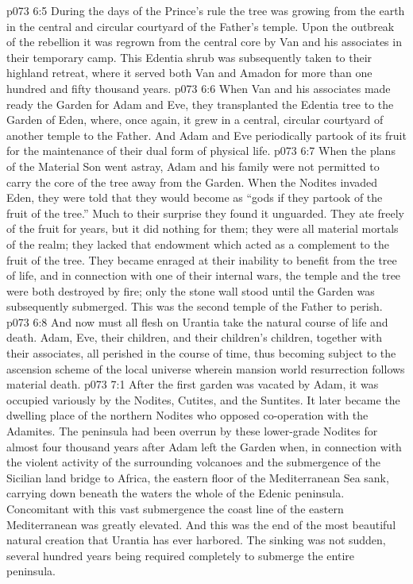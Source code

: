 \vs p073 6:5 \pc During the days of the Prince’s rule the tree was growing from the earth in the central and circular courtyard of the Father’s temple. Upon the outbreak of the rebellion it was regrown from the central core by Van and his associates in their temporary camp. This Edentia shrub was subsequently taken to their highland retreat, where it served both Van and Amadon for more than one hundred and fifty thousand years.
\vs p073 6:6 When Van and his associates made ready the Garden for Adam and Eve, they transplanted the Edentia tree to the Garden of Eden, where, once again, it grew in a central, circular courtyard of another temple to the Father. And Adam and Eve periodically partook of its fruit for the maintenance of their dual form of physical life.
\vs p073 6:7 \pc When the plans of the Material Son went astray, Adam and his family were not permitted to carry the core of the tree away from the Garden. When the Nodites invaded Eden, they were told that they would become as “gods if they partook of the fruit of the tree.” Much to their surprise they found it unguarded. They ate freely of the fruit for years, but it did nothing for them; they were all material mortals of the realm; they lacked that endowment which acted as a complement to the fruit of the tree. They became enraged at their inability to benefit from the tree of life, and in connection with one of their internal wars, the temple and the tree were both destroyed by fire; only the stone wall stood until the Garden was subsequently submerged. This was the second temple of the Father to perish.
\vs p073 6:8 And now must all flesh on Urantia take the natural course of life and death. Adam, Eve, their children, and their children’s children, together with their associates, all perished in the course of time, thus becoming subject to the ascension scheme of the local universe wherein mansion world resurrection follows material death.
\vs p073 7:1 After the first garden was vacated by Adam, it was occupied variously by the Nodites, Cutites, and the Suntites. It later became the dwelling place of the northern Nodites who opposed co\hyp{}operation with the Adamites. The peninsula had been overrun by these lower\hyp{}grade Nodites for almost four thousand years after Adam left the Garden when, in connection with the violent activity of the surrounding volcanoes and the submergence of the Sicilian land bridge to Africa, the eastern floor of the Mediterranean Sea sank, carrying down beneath the waters the whole of the Edenic peninsula. Concomitant with this vast submergence the coast line of the eastern Mediterranean was greatly elevated. And this was the end of the most beautiful natural creation that Urantia has ever harbored. The sinking was not sudden, several hundred years being required completely to submerge the entire peninsula.
